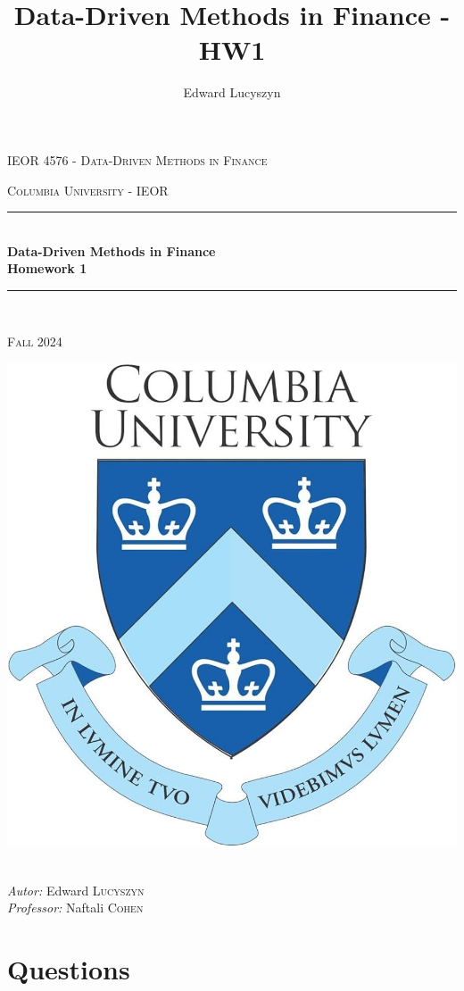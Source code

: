 \documentclass[a4paper,11pt]{article}
\title{Data-Driven Methods in Finance - HW1}
\author{Edward Lucyszyn}
\date{\September 2024}
\newcommand{\HRule}{\rule{\linewidth}{0.5mm}}
\begin{document}
\begin{titlepage}
\begin{center}

\LARGE \textsc{IEOR 4576 - Data-Driven Methods in Finance}

\vspace{0.2cm}

\Large \textsc{Columbia University - IEOR}

\vspace{0.3cm}

\HRule \\[0.4cm]
{\huge \bfseries Data-Driven Methods in Finance\\
Homework 1
\\[0.2cm]}
\HRule \\[0.4cm]

\vspace{2cm}

\textsc{Fall 2024}

\vspace{2cm}

\includegraphics[width=0.4\columnwidth]{logo.jpg}~\\[2cm]

\begin{minipage}{0.45\textwidth}
\begin{flushleft} \Large
    \textit{Autor: }Edward \textsc{Lucyszyn}\\
    \textit{Professor: }Naftali \textsc{Cohen}
\end{flushleft}
\end{minipage}

\vfill

\end{center}
\end{titlepage}

\setcounter{tocdepth}{2}

\newpage

\section*{Questions}
\end{document}
